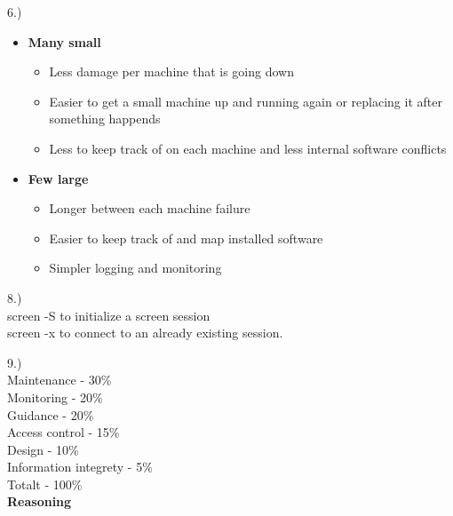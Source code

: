 6.) \begin{itemize}
	\item \textbf{Many small}
		\begin{itemize}
			\item Less damage per machine that is going down
			\item Easier to get a small machine up and running again or replacing it after something happends
			\item Less to keep track of on each machine and less internal software conflicts
		\end{itemize}
	\item \textbf{Few large}
		\begin{itemize}
			\item Longer between each machine failure
			\item Easier to keep track of and map installed software
			\item Simpler logging and monitoring
		\end{itemize}
\end{itemize}

8.) \\
screen -S  to initialize a screen session\\
screen -x to connect to an already existing session.

9.) \\
Maintenance - 30\% \\
Monitoring - 20\% \\
Guidance  - 20\% \\
Access control - 15\% \\
Design - 10\% \\
Information integrety  - 5\% \\
Totalt	    - 100\% \\

\textbf{Reasoning}

